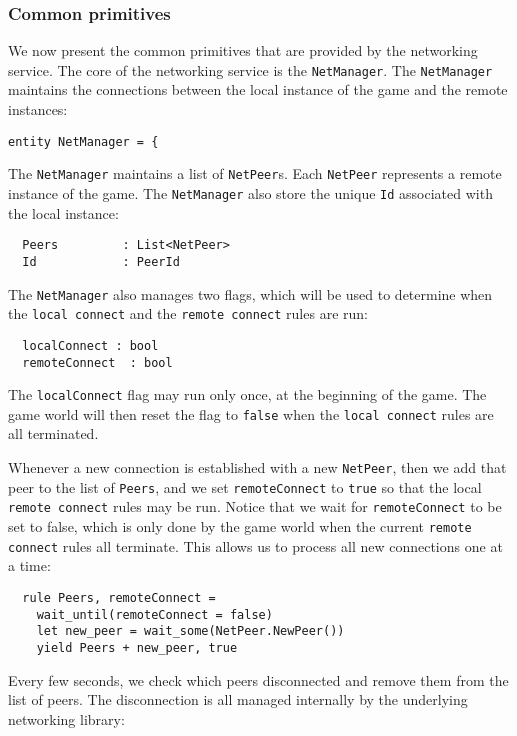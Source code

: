 \subsubsection{Common primitives}
We now present the common primitives that are provided by the networking service. The core of the networking service is the \texttt{NetManager}. The \texttt{NetManager} maintains the connections between the local instance of the game and the remote instances:

\begin{lstlisting}
entity NetManager = {
\end{lstlisting}

The \texttt{NetManager} maintains a list of \texttt{NetPeer}s. Each \texttt{NetPeer} represents a remote instance of the game. The \texttt{NetManager} also store the unique \texttt{Id} associated with the local instance:

\begin{lstlisting}
  Peers         : List<NetPeer>
  Id            : PeerId
\end{lstlisting}

The \texttt{NetManager} also manages two flags, which will be used to determine when the \texttt{local connect} and the \texttt{remote connect} rules are run:

\begin{lstlisting}
  localConnect : bool
  remoteConnect  : bool
\end{lstlisting}

The \texttt{localConnect} flag may run only once, at the beginning of the game. The game world will then reset the flag to \texttt{false} when the \texttt{local connect} rules are all terminated.

Whenever a new connection is established with a new \texttt{NetPeer}, then we add that peer to the list of \texttt{Peers}, and we set \texttt{remoteConnect} to \texttt{true} so that the local \texttt{remote connect} rules may be run. Notice that we wait for \texttt{remoteConnect} to be set to false, which is only done by the game world when the current \texttt{remote connect} rules all terminate. This allows us to process all new connections one at a time:

\begin{lstlisting}
  rule Peers, remoteConnect =
    wait_until(remoteConnect = false)
    let new_peer = wait_some(NetPeer.NewPeer())
    yield Peers + new_peer, true
\end{lstlisting}

Every few seconds, we check which peers disconnected and remove them from the list of peers. The disconnection is all managed internally by the underlying networking library:

